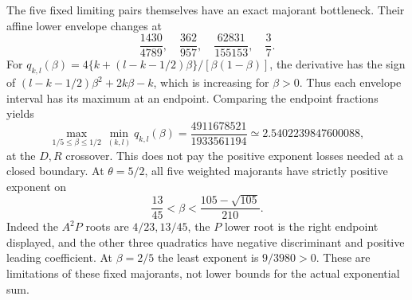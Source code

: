 \documentclass[11pt]{article}
\numberwithin{equation}{section}
\theoremstyle{definition}
\theoremstyle{remark}
\begin{document}
The five fixed limiting pairs themselves have an exact majorant
bottleneck. Their affine lower envelope changes at
\[
 \frac{1430}{4789},\quad\frac{362}{957},\quad
 \frac{62831}{155153},\quad\frac37.
\]
For $q_{k,l}(\beta)=4\{k+(l-k-1/2)\beta\}/[\beta(1-\beta)]$,
the derivative has the sign of
$(l-k-1/2)\beta^2+2k\beta-k$, which is increasing for $\beta>0$.
Thus each envelope interval has its maximum at an endpoint. Comparing
the endpoint fractions yields
\begin{equation}
 \max_{1/5\le\beta\le1/2}\min_{(k,l)}q_{k,l}(\beta)
    =\frac{4911678521}{1933561194}
    \simeq2.5402239847600088,
 \label{upd:five-pair-bottleneck}
\end{equation}
at the $D,R$ crossover.  This does not pay the positive exponent losses
needed at a closed boundary.  At $\theta=5/2$, all five weighted
majorants have strictly positive exponent on
\[
 \frac{13}{45}<\beta<\frac{105-\sqrt{105}}{210}.
\]
Indeed the $A^2P$ roots are $4/23,13/45$, the $P$ lower root is the
right endpoint displayed, and the other three quadratics have negative
discriminant and positive leading coefficient. At $\beta=2/5$ the
least exponent is $9/3980>0$. These are limitations of these fixed
majorants, not lower bounds for the actual exponential sum.
\end{document}
